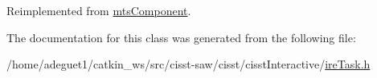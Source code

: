 Reimplemented from \hyperlink{classmts_component_aaf28f0262b44eb6866e10089a02fa6e4}{mts\-Component}.



The documentation for this class was generated from the following file\-:\begin{DoxyCompactItemize}
\item 
/home/adeguet1/catkin\-\_\-ws/src/cisst-\/saw/cisst/cisst\-Interactive/\hyperlink{ire_task_8h}{ire\-Task.\-h}\end{DoxyCompactItemize}
